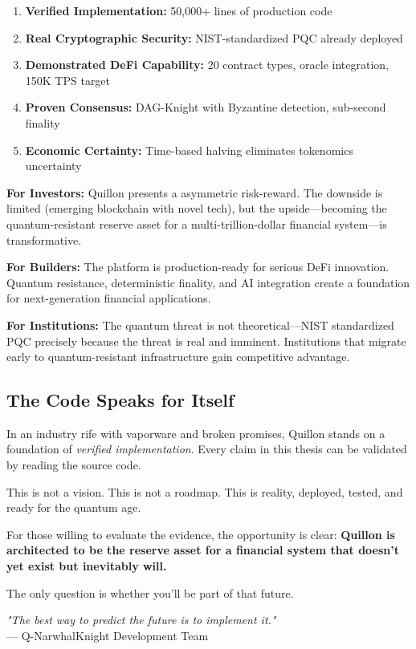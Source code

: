 \documentclass[11pt,a4paper]{article}
\begin{document}
\begin{enumerate}[leftmargin=*]
\item \textbf{Verified Implementation:} 50,000+ lines of production code
\item \textbf{Real Cryptographic Security:} NIST-standardized PQC already deployed
\item \textbf{Demonstrated DeFi Capability:} 20 contract types, oracle integration, 150K TPS target
\item \textbf{Proven Consensus:} DAG-Knight with Byzantine detection, sub-second finality
\item \textbf{Economic Certainty:} Time-based halving eliminates tokenomics uncertainty
\end{enumerate}

\textbf{For Investors:} Quillon presents a asymmetric risk-reward. The downside is limited (emerging blockchain with novel tech), but the upside—becoming the quantum-resistant reserve asset for a multi-trillion-dollar financial system—is transformative.

\textbf{For Builders:} The platform is production-ready for serious DeFi innovation. Quantum resistance, deterministic finality, and AI integration create a foundation for next-generation financial applications.

\textbf{For Institutions:} The quantum threat is not theoretical—NIST standardized PQC precisely because the threat is real and imminent. Institutions that migrate early to quantum-resistant infrastructure gain competitive advantage.

\subsection{The Code Speaks for Itself}

In an industry rife with vaporware and broken promises, Quillon stands on a foundation of \textit{verified implementation}. Every claim in this thesis can be validated by reading the source code.

This is not a vision. This is not a roadmap. This is reality, deployed, tested, and ready for the quantum age.

For those willing to evaluate the evidence, the opportunity is clear: \textbf{Quillon is architected to be the reserve asset for a financial system that doesn't yet exist but inevitably will.}

The only question is whether you'll be part of that future.

\vspace{1cm}
\begin{center}
\textit{"The best way to predict the future is to implement it."}\\
— Q-NarwhalKnight Development Team
\end{center}
\end{document}
